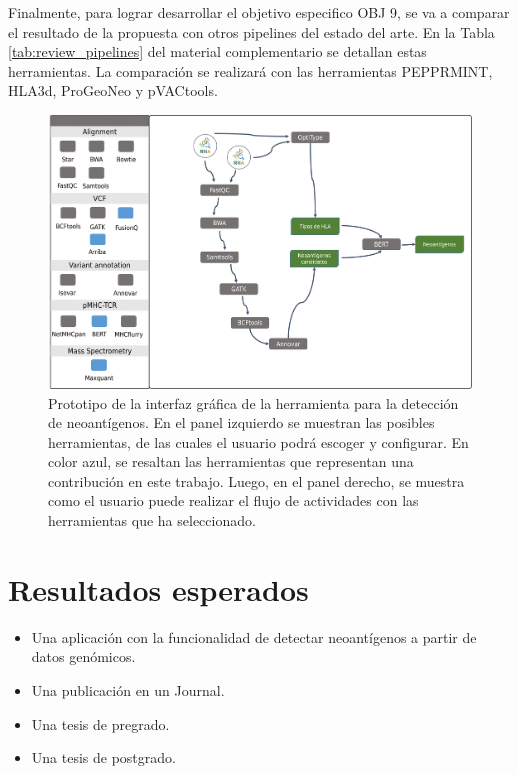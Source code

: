 \documentclass[a4paper,11pt]{article}
\begin{document}
Finalmente, para lograr desarrollar el objetivo especifico OBJ 9, se va a comparar el resultado de la propuesta con otros pipelines del estado del arte. En la Tabla \ref{tab:review_pipelines} del material complementario se detallan estas herramientas. La comparación se realizará con las herramientas PEPPRMINT, HLA3d, ProGeoNeo y pVACtools. 



\begin{figure}[H]
	\centering
	\includegraphics[width=\textwidth]{../img/proposal/gui2}
	\caption{Prototipo de la interfaz gráfica de la herramienta para la detección de neoantígenos. En el panel izquierdo se muestran las posibles herramientas, de las cuales el usuario podrá escoger y configurar. En color azul, se resaltan las herramientas que representan una contribución en este trabajo. Luego, en el panel derecho, se muestra como el usuario puede realizar el flujo de actividades con las herramientas que ha seleccionado.}
	\label{fig:gui}
\end{figure}








\section{Resultados esperados}

\begin{itemize}
	\item Una aplicación con la funcionalidad de detectar neoantígenos a partir de datos genómicos.
	\item Una publicación en un Journal.
	\item Una tesis de pregrado.
	\item Una tesis de postgrado.
\end{itemize}
\end{document}
